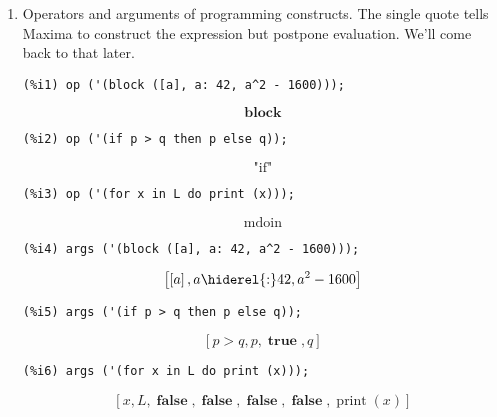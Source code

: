 \documentclass[12pt,leqno]{article}
\begin{document}
\begin{enumerate}
\item Operators and arguments of programming constructs.
The single quote tells Maxima to construct the expression but postpone evaluation.
We'll come back to that later.
\begin{verbatim}
(%i1) op ('(block ([a], a: 42, a^2 - 1600)));
\end{verbatim}
\begin{dmath}[number={\(\mathop{\mathrm{\%o}_{1}}\)}]
\mathop{\mathbf{block}}
\end{dmath}
\begin{verbatim}
(%i2) op ('(if p > q then p else q));
\end{verbatim}
\begin{dmath}[number={\(\mathop{\mathrm{\%o}_{2}}\)}]
\text{"if"}
\end{dmath}
\begin{verbatim}
(%i3) op ('(for x in L do print (x)));
\end{verbatim}
\begin{dmath}[number={\(\mathop{\mathrm{\%o}_{3}}\)}]
\mathop{\mathrm{mdoin}}
\end{dmath}
\begin{verbatim}
(%i4) args ('(block ([a], a: 42, a^2 - 1600)));
\end{verbatim}
\begin{dmath}[number={\(\mathop{\mathrm{\%o}_{4}}\)}]
\left[\left[a\right], a \hiderel{:} 42, {a}^{2}-1600\right]
\end{dmath}
\begin{verbatim}
(%i5) args ('(if p > q then p else q));
\end{verbatim}
\begin{dmath}[number={\(\mathop{\mathrm{\%o}_{5}}\)}]
\left[p > q, p, \mathop{\mathbf{true}}, q\right]
\end{dmath}
\begin{verbatim}
(%i6) args ('(for x in L do print (x)));
\end{verbatim}
\begin{dmath}[number={\(\mathop{\mathrm{\%o}_{6}}\)}]
\left[x, L, \mathop{\mathbf{false}}, \mathop{\mathbf{false}}, \mathop{\mathbf{false}}, \mathop{\mathbf{false}}, \mathop{\mathrm{print}}\left(x\right)\right]
\end{dmath}


\end{enumerate}
\end{document}
